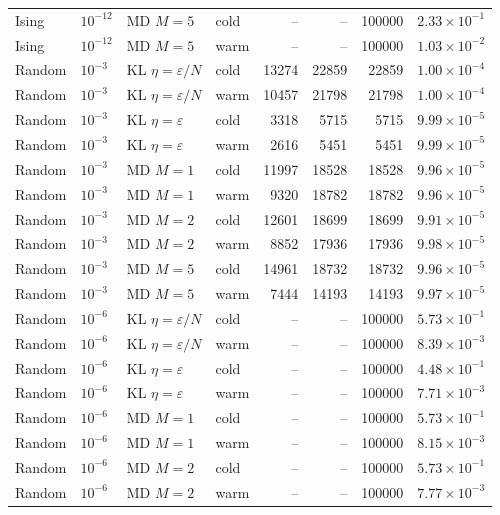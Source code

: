 \begin{table}[t]
\begin{tabular}{llllrrrr}
Ising & $10^{-12}$ & MD $M=5$ & cold & -- & -- & 100000 & $2.33\times 10^{-1}$ \\
Ising & $10^{-12}$ & MD $M=5$ & warm & -- & -- & 100000 & $1.03\times 10^{-2}$ \\
\midrule
Random & $10^{-3}$ & KL $\eta=\varepsilon/N$ & cold & 13274 & 22859 & 22859 & $1.00\times 10^{-4}$ \\
Random & $10^{-3}$ & KL $\eta=\varepsilon/N$ & warm & 10457 & 21798 & 21798 & $1.00\times 10^{-4}$ \\
Random & $10^{-3}$ & KL $\eta=\varepsilon$ & cold & 3318 & 5715 & 5715 & $9.99\times 10^{-5}$ \\
Random & $10^{-3}$ & KL $\eta=\varepsilon$ & warm & 2616 & 5451 & 5451 & $9.99\times 10^{-5}$ \\
Random & $10^{-3}$ & MD $M=1$ & cold & 11997 & 18528 & 18528 & $9.96\times 10^{-5}$ \\
Random & $10^{-3}$ & MD $M=1$ & warm & 9320 & 18782 & 18782 & $9.96\times 10^{-5}$ \\
Random & $10^{-3}$ & MD $M=2$ & cold & 12601 & 18699 & 18699 & $9.91\times 10^{-5}$ \\
Random & $10^{-3}$ & MD $M=2$ & warm & 8852 & 17936 & 17936 & $9.98\times 10^{-5}$ \\
Random & $10^{-3}$ & MD $M=5$ & cold & 14961 & 18732 & 18732 & $9.96\times 10^{-5}$ \\
Random & $10^{-3}$ & MD $M=5$ & warm & 7444 & 14193 & 14193 & $9.97\times 10^{-5}$ \\
\midrule
Random & $10^{-6}$ & KL $\eta=\varepsilon/N$ & cold & -- & -- & 100000 & $5.73\times 10^{-1}$ \\
Random & $10^{-6}$ & KL $\eta=\varepsilon/N$ & warm & -- & -- & 100000 & $8.39\times 10^{-3}$ \\
Random & $10^{-6}$ & KL $\eta=\varepsilon$ & cold & -- & -- & 100000 & $4.48\times 10^{-1}$ \\
Random & $10^{-6}$ & KL $\eta=\varepsilon$ & warm & -- & -- & 100000 & $7.71\times 10^{-3}$ \\
Random & $10^{-6}$ & MD $M=1$ & cold & -- & -- & 100000 & $5.73\times 10^{-1}$ \\
Random & $10^{-6}$ & MD $M=1$ & warm & -- & -- & 100000 & $8.15\times 10^{-3}$ \\
Random & $10^{-6}$ & MD $M=2$ & cold & -- & -- & 100000 & $5.73\times 10^{-1}$ \\
Random & $10^{-6}$ & MD $M=2$ & warm & -- & -- & 100000 & $7.77\times 10^{-3}$ \\

\end{tabular}
\end{table}
